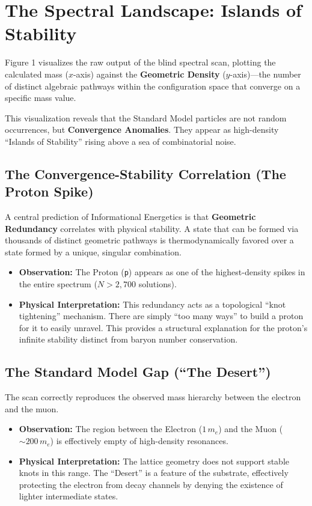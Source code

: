 \section{The Spectral Landscape: Islands of Stability}

Figure 1 visualizes the raw output of the blind spectral scan, plotting the calculated mass ($x$-axis) against the \textbf{Geometric Density} ($y$-axis)—the number of distinct algebraic pathways within the configuration space that converge on a specific mass value. 

This visualization reveals that the Standard Model particles are not random occurrences, but \textbf{Convergence Anomalies}. They appear as high-density ``Islands of Stability'' rising above a sea of combinatorial noise.

\subsection{The Convergence-Stability Correlation (The Proton Spike)}

A central prediction of Informational Energetics is that \textbf{Geometric Redundancy} correlates with physical stability. A state that can be formed via thousands of distinct geometric pathways is thermodynamically favored over a state formed by a unique, singular combination.

\begin{itemize}
    \item \textbf{Observation:} The Proton (\texttt{p}) appears as one of the highest-density spikes in the entire spectrum ($N > 2,700$ solutions).
    \item \textbf{Physical Interpretation:} This redundancy acts as a topological ``knot tightening'' mechanism. There are simply ``too many ways'' to build a proton for it to easily unravel. This provides a structural explanation for the proton’s infinite stability distinct from baryon number conservation.
\end{itemize}

\subsection{The Standard Model Gap (``The Desert'')}

The scan correctly reproduces the observed mass hierarchy between the electron and the muon.

\begin{itemize}
    \item \textbf{Observation:} The region between the Electron ($1 \, m_e$) and the Muon ($\sim 200 \, m_e$) is effectively empty of high-density resonances.
    \item \textbf{Physical Interpretation:} The lattice geometry does not support stable knots in this range. The ``Desert'' is a feature of the substrate, effectively protecting the electron from decay channels by denying the existence of lighter intermediate states.
\end{itemize}

